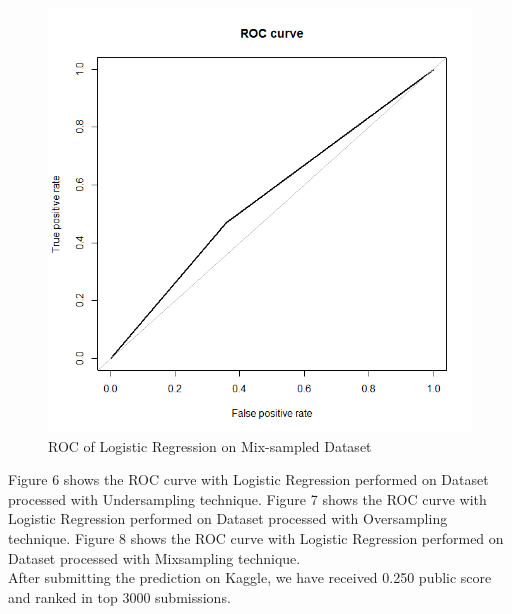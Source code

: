 \documentclass[fleqn,10pt]{SelfArx} %
\begin{document}
	\begin{figure}[h]
	\includegraphics[width=0.8\columnwidth]{plots/ROC_both.png}\centering
	\caption{ROC of Logistic Regression on Mix-sampled Dataset}
	\end{figure}
	
	Figure 6 shows the ROC curve with Logistic Regression performed on Dataset processed with Undersampling technique. Figure 7 shows the ROC curve with Logistic Regression performed on Dataset processed with Oversampling technique. Figure 8 shows the ROC curve with Logistic Regression performed on Dataset processed with Mixsampling technique.\\
	
	After submitting the prediction on Kaggle, we have received 0.250 public score and ranked in top 3000 submissions.\\   

\newpage
\end{document}

